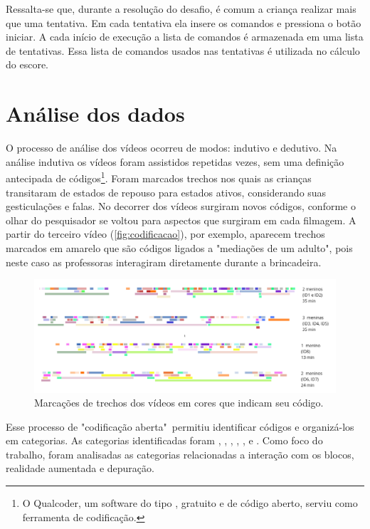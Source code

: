 Ressalta-se que, durante a resolução do desafio, é comum a criança realizar mais que uma tentativa. Em cada tentativa ela insere os comandos e pressiona o botão iniciar. A cada início de execução a lista de comandos é armazenada em uma lista de tentativas. Essa lista de comandos usados nas tentativas é utilizada no cálculo do escore.

\section{Análise dos dados}

O processo de análise dos vídeos ocorreu de modos: indutivo e dedutivo. Na análise indutiva os vídeos foram assistidos repetidas vezes, sem uma definição antecipada de códigos\footnote{O Qualcoder, um software do tipo , gratuito e de código aberto, serviu como ferramenta de codificação.}. Foram marcados trechos nos quais as crianças transitaram de estados de repouso para estados ativos, considerando suas gesticulações e falas. No decorrer dos vídeos surgiram novos códigos, conforme o olhar do pesquisador se voltou para aspectos que surgiram em cada filmagem. A partir do terceiro vídeo (\autoref{fig:codificacao}), por exemplo, aparecem trechos marcados em amarelo que são códigos ligados a "mediações de um adulto", pois neste caso as professoras interagiram diretamente durante a brincadeira.

\begin{figure}[!htpb]
    \centering
    \includegraphics[width=1\linewidth,fbox]{figs/codificacao_aberta.png}
    \caption{Marcações de trechos dos vídeos em cores que indicam seu código.}
    \sourceauthor
    \label{fig:codificacao}
\end{figure}

Esse processo de "codificação aberta"\ permitiu identificar códigos e organizá-los em categorias. As categorias identificadas foram , , , , ,  e . Como foco do trabalho, foram analisadas as categorias relacionadas a interação com os blocos, realidade aumentada e depuração. 

